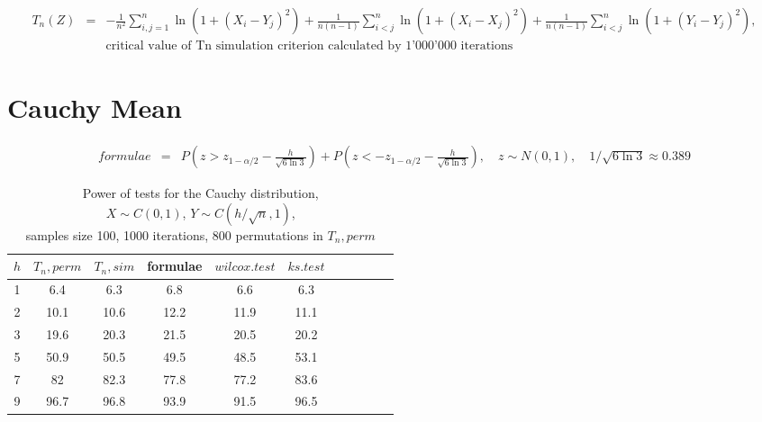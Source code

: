 \documentclass{report}
\begin{document}
\begin{eqnarray*}
  T_n(Z) &=& -\frac{1}{n^2}\sum_{i,j=1}^n\ln(1+(X_i-Y_j)^2)+\frac{1}{n(n-1)}\sum_{i<j}^n\ln(1+(X_i-X_j)^2)+\frac{1}{n(n-1)}\sum_{i<j}^n\ln(1+(Y_i-Y_j)^2),\\
  && \text{critical value of Tn simulation criterion calculated by 1'000'000 iterations}
\end{eqnarray*}

\section*{Cauchy Mean}

\begin{eqnarray*}
  formulae &=& P(z > z_{1-\alpha/2} - \frac{h}{\sqrt{6\ln 3}}) + P(z < -z_{1-\alpha/2} - \frac{h}{\sqrt{6\ln 3}}),\quad z\sim N(0,1),\quad 1/\sqrt{6\ln 3}\approx 0.389
\end{eqnarray*}

\begin{longtable}{|c|c|c|c|c|c|c|c|c|c|c|}
  \caption{Power of tests for the Cauchy distribution, \\
           $X\sim C(0,1)$, $Y\sim C(h/\sqrt{n},1)$, \\
           samples size 100, 1000 iterations, 800 permutations in $T_n, perm$} \\
  \hline
  $h$ & $T_n, perm$ & $T_n, sim$ & formulae & $wilcox.test$ & $ks.test$ \\ \hline
  1 & 6.4 & 6.3 & 6.8 & 6.6 & 6.3 \\
  2 & 10.1 & 10.6 & 12.2 & 11.9 & 11.1 \\
  3 & 19.6 & 20.3 & 21.5 & 20.5 & 20.2 \\
  5 & 50.9 & 50.5 & 49.5 & 48.5 & 53.1 \\
  7 & 82 & 82.3 & 77.8 & 77.2 & 83.6 \\
  9 & 96.7 & 96.8 & 93.9 & 91.5 & 96.5 \\ \hline
\end{longtable}
\end{document}
